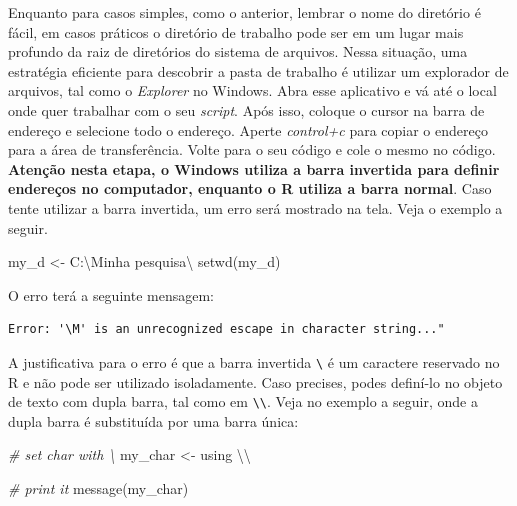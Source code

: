 \documentclass[
  11pt,
]{book}
\newenvironment{Shaded}{\begin{snugshade}}{\end{snugshade}}
\newcommand{\CommentTok}[1]{\textcolor[rgb]{0.37,0.37,0.37}{\textit{#1}}}
\newcommand{\FunctionTok}[1]{\textcolor[rgb]{0,0,0}{#1}}
\newcommand{\NormalTok}[1]{#1}
\newcommand{\OtherTok}[1]{\textcolor[rgb]{0.37,0.37,0.37}{#1}}
\newcommand{\SpecialCharTok}[1]{\textcolor[rgb]{0,0,0}{#1}}
\newcommand{\StringTok}[1]{\textcolor[rgb]{0.5,0.5,0.5}{#1}}
\begin{document}
Enquanto para casos simples, como o anterior, lembrar o nome do diretório é fácil, em casos práticos o diretório de trabalho pode ser em um lugar mais profundo da raiz de diretórios do sistema de arquivos. Nessa situação, uma estratégia eficiente para descobrir a pasta de trabalho é utilizar um explorador de arquivos, tal como o \emph{Explorer} no Windows. Abra esse aplicativo e vá até o local onde quer trabalhar com o seu \emph{script}. Após isso, coloque o cursor na barra de endereço e selecione todo o endereço. Aperte \emph{control+c} para copiar o endereço para a área de transferência. Volte para o seu código e cole o mesmo no código. \textbf{Atenção nesta etapa, o Windows utiliza a barra invertida para definir endereços no computador, enquanto o R utiliza a barra normal}. Caso tente utilizar a barra invertida, um erro será mostrado na tela. Veja o exemplo a seguir.

\begin{Shaded}
\begin{Highlighting}[]
\NormalTok{my\_d }\OtherTok{\textless{}{-}} \StringTok{\textquotesingle{}C:\textbackslash{}Minha pesquisa}\SpecialCharTok{\textbackslash{}\textquotesingle{}}
\StringTok{setwd(my\_d)}
\end{Highlighting}
\end{Shaded}

O erro terá a seguinte mensagem:

\begin{verbatim}
Error: '\M' is an unrecognized escape in character string..."
\end{verbatim}

A justificativa para o erro é que a barra invertida \texttt{\textbackslash{}} é um caractere reservado no R e não pode ser utilizado isoladamente. Caso precises, podes definí-lo no objeto de texto com dupla barra, tal como em \texttt{\textbackslash{}\textbackslash{}}. Veja no exemplo a seguir, onde a dupla barra é substituída por uma barra única:

\begin{Shaded}
\begin{Highlighting}[]
\CommentTok{\# set char with \textbackslash{}}
\NormalTok{my\_char }\OtherTok{\textless{}{-}} \StringTok{\textquotesingle{}using }\SpecialCharTok{\textbackslash{}\textbackslash{}}\StringTok{\textquotesingle{}}

\CommentTok{\# print it}
\FunctionTok{message}\NormalTok{(my\_char)}
\end{Highlighting}
\end{Shaded}
\end{document}
